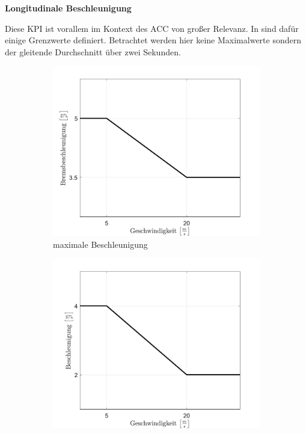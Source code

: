 \bigskip\noindent\textbf{Longitudinale Beschleunigung}

\noindent Diese KPI ist vorallem im Kontext des ACC von großer Relevanz. In \cite{ISO15622} sind dafür einige Grenzwerte definiert. Betrachtet werden hier keine Maximalwerte sondern der gleitende Durchschnitt über zwei Sekunden.
\begin{figure}[ht]
    \centering
    \hspace*{\fill}
    \begin{subfigure}[b]{.4\textwidth}
        \centering
        \includegraphics[width=\textwidth]{figures/3_Implementierung/max_acceleration.pdf}
        \caption{maximale Beschleunigung}
        \label{fig:max_acceleration}
    \end{subfigure}
    \hfill
    \begin{subfigure}[b]{.4\textwidth}
        \centering
        \includegraphics[width=\textwidth]{figures/3_Implementierung/max_deceleration.pdf}

\end{subfigure}
\end{figure}
